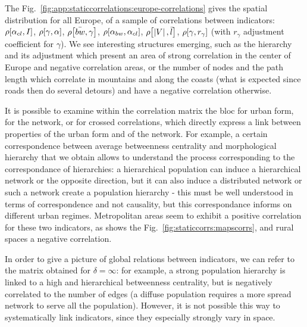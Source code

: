 The Fig.~\ref{fig:app:staticcorrelations:europe-correlations} gives the spatial distribution for all Europe, of a sample of correlations between indicators: $\rho\!\left[\alpha_{cl},I\right]$, $\rho\!\left[\gamma,\alpha\right]$, $\rho\!\left[\bar{bw},\gamma\right]$, $\rho\!\left[\alpha_{bw},\alpha_{cl}\right]$, $\rho\!\left[\left|V\right|,\bar{l}\right]$, $\rho\!\left[\gamma,r_{\gamma}\right]$ (with $r_{\gamma}$ adjustment coefficient for $\gamma$). We see interesting structures emerging, such as the hierarchy and its adjustment which present an area of strong correlation in the center of Europe and negative correlation areas, or the number of nodes and the path length which correlate in mountains and along the coasts (what is expected since roads then do several detours) and have a negative correlation otherwise.




It is possible to examine within the correlation matrix the bloc for urban form, for the network, or for crossed correlations, which directly express a link between properties of the urban form and of the network. For example, a certain correspondence between average betweenness centrality and morphological hierarchy that we obtain allows to understand the process corresponding to the correspondance of hierarchies: a hierarchical population can induce a hierarchical network or the opposite direction, but it can also induce a distributed network or such a network create a population hierarchy - this must be well understood in terms of correspondence and not causality, but this correspondance informs on different urban regimes. Metropolitan areas seem to exhibit a positive correlation for these two indicators, as shows the Fig.~\ref{fig:staticcorrs:mapscorrs}, and rural spaces a negative correlation.


In order to give a picture of global relations between indicators, we can refer to the matrix obtained for $\delta = \infty$: for example, a strong population hierarchy is linked to a high and hierarchical betweenness centrality, but is negatively correlated to the number of edges (a diffuse population requires a more spread network to serve all the population). However, it is not possible this way to systematically link indicators, since they especially strongly vary in space. 


